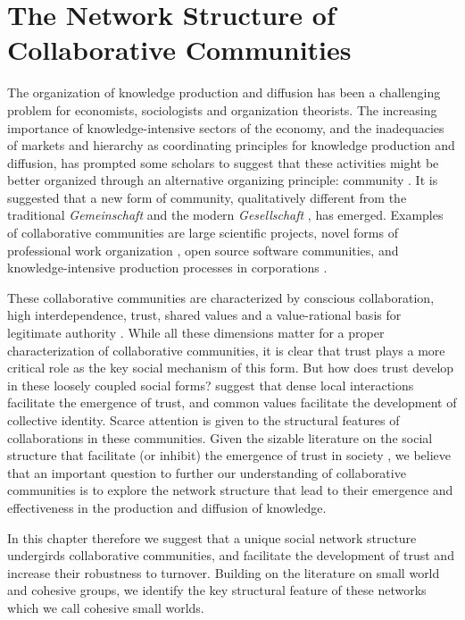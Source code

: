 
\chapter{The Network Structure of Collaborative Communities}
\label{collaborative_communities}

The organization of knowledge production and diffusion has been a challenging problem for economists, sociologists and organization theorists. The increasing importance of knowledge-intensive sectors of the economy, and the inadequacies of markets and hierarchy as coordinating principles for knowledge production and diffusion, has prompted some scholars to suggest that these activities might be better organized through an alternative organizing principle: community \citep{adler:2001}. It is suggested that a new form of community, qualitatively different from the traditional \emph{Gemeinschaft} and the modern \emph{Gesellschaft} \citep{tonnies:1974}, has emerged.  Examples of collaborative communities are large scientific projects, novel forms of professional work organization \citep*{adler:2008}, open source software communities, and knowledge-intensive production processes in corporations \citep{adler:2006}.

These collaborative communities are characterized by conscious collaboration, high interdependence, trust, shared values and a value-rational basis for legitimate authority \citep{adler:2006,adler:2008}. While all these dimensions matter for a proper characterization of collaborative communities, it is clear that trust plays a more critical role as the key social mechanism of this form. But how does trust develop in these loosely coupled social forms? \citet{adler:2006} suggest that dense local interactions facilitate the emergence of trust, and common values facilitate the development of collective identity.  Scarce attention is given to the structural features of collaborations in these communities. Given the sizable literature on the social structure that facilitate (or inhibit) the emergence of trust in society \citep{granovetter:1985,coleman:1988,moody:2003}, we believe that an important question to further our understanding of collaborative communities is to explore the network structure that lead to their emergence and effectiveness in the production and diffusion of knowledge.

In this chapter therefore we suggest that a unique social network structure undergirds collaborative communities, and facilitate the development of trust and increase their robustness to turnover. Building on the literature on small world and cohesive groups, we identify the key structural feature of these networks which we call cohesive small worlds.

